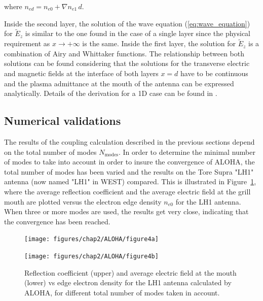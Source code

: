 where $n_{ed}=n_{e0}+\nabla n_{e1}\, d$.


Inside the second layer, the solution of the wave equation (\ref{eq:wave_equation}) for $\tilde{E}_{z}$ is similar to the one found in the case of a single layer since the physical requirement as $x\rightarrow+\infty$ is the same. Inside the first layer, the solution for $\tilde{E}_{z}$ is a combination of Airy and Whittaker functions. The relationship between both solutions can be found considering that the solutions for the transverse electric and magnetic fields at the interface of both layers $x=d$ have to be continuous and the plasma admittance at the mouth of the antenna can be expressed analytically. Details of the derivation for a 1D case can be found in .


\subsection{Numerical validations}\label{sec:numerical_considerations}

The results of the coupling calculation described in the previous sections depend on the total number of modes $N_{\mbox{modes}}$. In order to determine the minimal number of modes to take into account in order to insure the convergence of ALOHA, the total number of modes has been varied and the results on the Tore Supra "LH1" antenna (now named "LH1" in WEST) compared. This is illustrated in Figure~\ref{fig:RC-E_vs_ne_vs_modes}, where the average reflection coefficient and the average electric field at the grill mouth are plotted versus the electron edge density $n_{e0}$ for the LH1 antenna. When three or more modes are used, the results get very
close, indicating that the convergence has been reached. 

%
\begin{figure}[h]
	\begin{centering}
		\texttt{[image: figures/chap2/ALOHA/figure4a]}
		\par\end{centering}
	
	\begin{centering}
		\texttt{[image: figures/chap2/ALOHA/figure4b]}
		\par\end{centering}
	
	\caption{Reflection coefficient (upper) and average electric
		field at the mouth (lower) vs edge electron density
		for the LH1 antenna calculated by ALOHA, for different total number
		of modes taken in account.\label{fig:RC-E_vs_ne_vs_modes} }
	
\end{figure}


